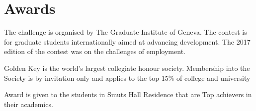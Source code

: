 \documentclass[]{deedy-resume-openfont}
\begin{document}
\begin{minipage}[t]{0.33\textwidth}

\section{Awards}

The challenge is organised by  The Graduate Institute of Geneva. The contest is for graduate students internationally aimed at advancing development. The 2017 edition of the contest was on the challenges of employment. 
\sectionsep

Golden Key is the world's largest collegiate honour society. Membership into the Society is by invitation only and applies to the top 15\% of college and university
\sectionsep

Award is given to the students in Smuts Hall Residence that are Top achievers in their academics.
\sectionsep

\end{minipage} 
\hfill
%
%
\end{document}
